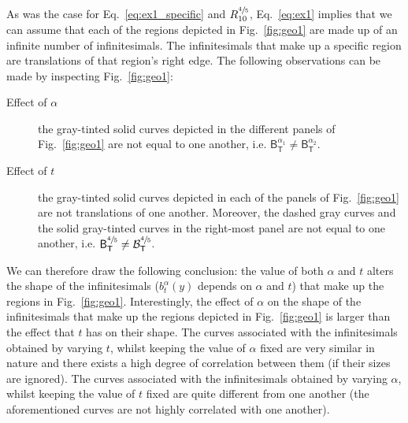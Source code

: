 \documentclass{article}
\theoremstyle{theorem}
\theoremstyle{definition}
\begin{document}
\noindent
As was the case for Eq.~\eqref{eq:ex1_specific} and $R_{10}^{\sfrac{4}{5}}$, Eq.~\eqref{eq:ex1} implies that we can assume that each of the regions depicted in Fig.~\ref{fig:geo1} are made up of an infinite number of infinitesimals. The infinitesimals that make up a specific region are translations of that region's right edge. 
The following observations can be made by inspecting Fig.~\ref{fig:geo1}: 
\begin{description}
 \item[Effect of $\alpha$] the gray-tinted solid curves depicted in the different panels of Fig.~\ref{fig:geo1} are not equal to one another, i.e. $\mathsf{B}_{\mathsf{T}}^{\alpha_1}\neq\mathsf{B}_{\mathsf{T}}^{\alpha_2}$. 
 \item[Effect of $t$] the gray-tinted solid curves depicted in each of the panels of Fig.~\ref{fig:geo1} are not translations of one another. Moreover, the dashed gray curves and the solid gray-tinted curves in the right-most panel are not equal to one another, i.e. $\mathsf{B}_{\mathsf{T}}^{\sfrac{4}{5}}\neq\mathcal{B}_{\mathsf{T}}^{\sfrac{4}{5}}$.
\end{description}
We can therefore draw the following conclusion: the value of both $\alpha$ and $t$ alters the shape of the infinitesimals ($b_{t}^{\alpha}(y)$ depends on $\alpha$ and $t$) that make up the regions in Fig.~\ref{fig:geo1}. Interestingly, the effect of $\alpha$ on the shape of the infinitesimals that make up the regions depicted in Fig.~\ref{fig:geo1} is larger than the effect that $t$ has on their shape. 
The curves associated with the infinitesimals obtained by varying $t$, whilst keeping the value of $\alpha$ fixed are very similar in nature and there exists a high degree of correlation between them (if their 
sizes are ignored). The curves associated with the infinitesimals obtained by varying $\alpha$, whilst keeping the value of $t$ fixed are quite different from one another (the aforementioned curves are not highly correlated with 
one another).\\  

\end{document}
